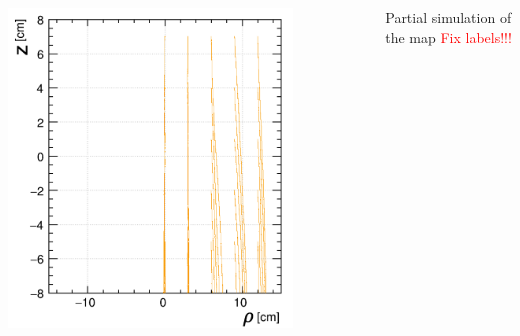 \documentclass{beamer}
\begin{document}
\begin{frame}
\begin{columns}
\begin{minipage}[t][4.2cm]{\textwidth}
					\includegraphics[width=0.8\textwidth]{../images/map_lines.png}\\
				\end{minipage}
				{Partial simulation of the map \textcolor{red}{Fix labels!!!}}
		\end{columns}
	\end{frame}
\end{document}
